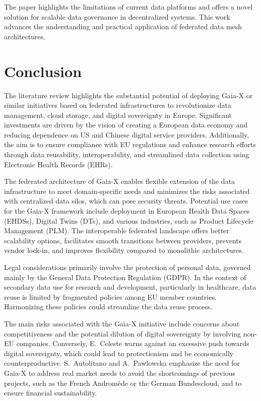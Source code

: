 The paper highlights the limitations of current data platforms and offers a novel solution for scalable data governance in decentralized systems.
This work advances the understanding and practical application of federated data mesh architectures.

\section{Conclusion}\label{sec:conclusion}

The literature review highlights the substantial potential of deploying Gaia-X or similar initiatives based on federated infrastructures to revolutionize data management, cloud storage, and digital sovereignty in Europe.
Significant investments are driven by the vision of creating a European data economy and reducing dependence on US and Chinese digital service providers.
Additionally, the aim is to ensure compliance with EU regulations and enhance research efforts through data reusability, interoperability, and streamlined data collection using Electronic Health Records (EHRs).

The federated architecture of Gaia-X enables flexible extension of the data infrastructure to meet domain-specific needs and minimizes the risks associated with centralized data silos, which can pose security threats.
Potential use cases for the Gaia-X framework include deployment in European Health Data Spaces (EHDSs), Digital Twins (DTs), and various industries, such as Product Lifecycle Management (PLM). The interoperable federated landscape offers better scalability options, facilitates smooth transitions between providers, prevents vendor lock-in, and improves flexibility compared to monolithic architectures.

Legal considerations primarily involve the protection of personal data, governed mainly by the General Data Protection Regulation (GDPR). In the context of secondary data use for research and development, particularly in healthcare, data reuse is limited by fragmented policies among EU member countries\cite{legal_and_technological_aspects_of_ehds}.
Harmonizing these policies could streamline the data reuse process.

The main risks associated with the Gaia-X initiative include concerns about competitiveness and the potential dilution of digital sovereignty by involving non-EU companies\cite{europe_quest_for_digital_sovereignty}.
Conversely, E.~Celeste\cite{dig_sovereignty_challenges} warns against an excessive push towards digital sovereignty, which could lead to protectionism and be economically counterproductive.
S.~Autolitano and A.~Pawlowska\cite{europe_quest_for_digital_sovereignty} emphasize the need for Gaia-X to address real market needs to avoid the shortcomings of previous projects, such as the French Andromède or the German Bundescloud, and to ensure financial sustainability.
